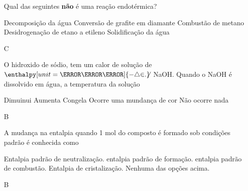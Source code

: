 \documentclass[9 pt]{scrartcl}
\def\PQ{0.84} %
\begin{document}
\begin{exercise}[points=\PQ]
Qual das seguintes \textbf{não} é uma reação endotérmica?

\begin{choice}
\choice Decomposição da água
\choice Conversão de grafite em diamante
\choice Combustão de metano
\choice Desidrogenação de etano a etileno
\choice Solidificação da água
\end{choice}
\end{exercise}
\begin{solution}
C
\end{solution}

\begin{exercise}[points=\PQ]
O hidroxido de sódio,  tem um calor de solução de $\enthalpy[unit=\kilo\cal\per\mole]{-42.6}$ NaOH. Quando o NaOH é dissolvido em água, a temperatura da solução


\begin{choice}
\choice Dimuinui
\choice Aumenta
\choice Congela
\choice Ocorre uma mundança de cor
\choice Não ocorre nada
\end{choice}
\end{exercise}
\begin{solution}
B
\end{solution}



\begin{exercise}[points=\PQ]
A mudança na entalpia quando 1 mol do composto é formado sob condições padrão é conhecida como

\begin{choice}
\choice Entalpia padrão de neutralização.
\choice entalpia padrão de formação.
\choice entalpia padrão de combustão.
\choice Entalpia de cristalização.
\choice Nenhuma das opções acima.
\end{choice}
\end{exercise}
\begin{solution}
B
\end{solution}
\end{document}

